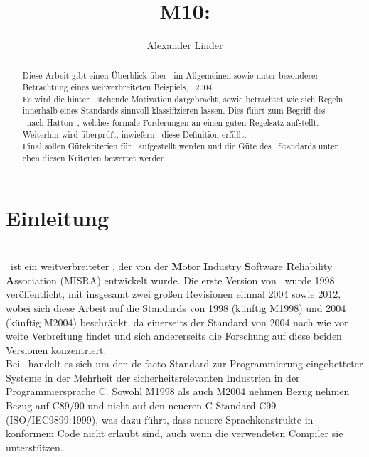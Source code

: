 \documentclass[a4paper,UKenglish,cleveref, autoref]{templates/lipics-v2019}
\title{M10: \sqss}
\author{Alexander Linder}{Karlsruhe Institute of Technology, Germany \and \url{https://kit.edu} }{alexander.linder@student.kit.edu}{}{}
\begin{document}
    \maketitle

    \begin{abstract}
        Diese Arbeit gibt einen Überblick über \sqss\ im Allgemeinen sowie unter besonderer Betrachtung eines weitverbreiteten Beispiels, \misra\ 2004.\\
        Es wird die hinter \sqss\ stehende Motivation dargebracht, sowie betrachtet wie sich Regeln innerhalb eines Standards sinnvoll klassifizieren lassen.
        Dies führt zum Begriff des \slss\ nach Hatton~\cite{hatton2004safer}, welches formale Forderungen an einen guten Regelsatz aufstellt.
        Weiterhin wird überprüft, inwiefern \misra\ diese Definition erfüllt.\\
        Final sollen Gütekriterien für \sqss\ aufgestellt werden und die Güte des \misra\ Standards unter eben diesen Kriterien bewertet werden.
    \end{abstract}

    \section{Einleitung}
    \label{sec:einleitung}

    \section{\misra}
    \label{sec:misra-c}
    \misra\ ist ein weitverbreiteter \sqs, der von der \textbf{M}otor \textbf{I}ndustry \textbf{S}oftware \textbf{R}eliability \textbf{A}ssociation (MISRA) entwickelt wurde.
    Die erste Version von \misra\ wurde 1998 veröffentlicht, mit insgesamt zwei großen Revisionen einmal 2004 sowie 2012,
    wobei sich diese Arbeit auf die Standards von 1998 (künftig M1998) und 2004 (künftig M2004) beschränkt, da einerseits der Standard von 2004 nach wie vor
    weite Verbreitung findet und sich andererseits die Forschung auf diese beiden Versionen konzentriert.\\
    Bei \misra\ handelt es sich um den de facto Standard zur Programmierung eingebetteter Systeme in der Mehrheit der sicherheitsrelevanten Industrien in der Programmiersprache C\@.\cite{misra-website}
    Sowohl M1998 als auch M2004 nehmen Bezug nehmen Bezug auf C89/90 und nicht auf den neueren C-Standard C99 (ISO/IEC9899:1999), was dazu führt, dass neuere Sprachkonstrukte in
    \misra-konformem Code nicht erlaubt sind, auch wenn die verwendeten Compiler sie unterstützen.
\end{document}
